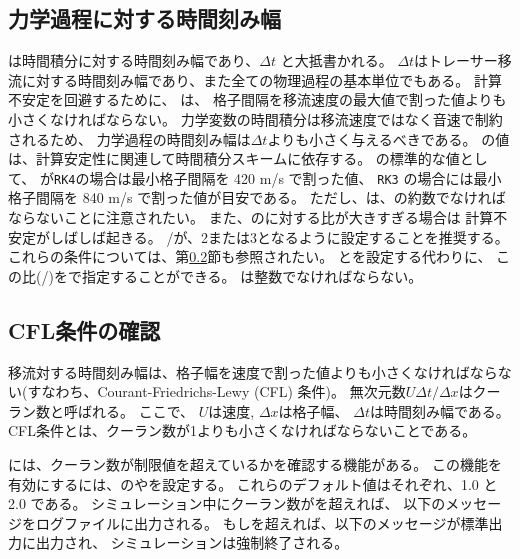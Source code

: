 \subsection{力学過程に対する時間刻み幅}

 は時間積分に対する時間刻み幅であり、$\Delta t$ と大抵書かれる。
$\Delta t$はトレーサー移流に対する時間刻み幅であり、また全ての物理過程の基本単位でもある。
計算不安定を回避するために、 は、
格子間隔を移流速度の最大値で割った値よりも小さくなければならない。
力学変数の時間積分は移流速度ではなく音速で制約されるため、
力学過程の時間刻み幅は$\Delta t$よりも小さく与えるべきである。
の値は、計算安定性に関連して時間積分スキームに依存する。
の標準的な値として、
が\verb|RK4|の場合は最小格子間隔を 420 m/s で割った値、
\verb|RK3| の場合には最小格子間隔を 840 m/s で割った値が目安である。
ただし、は、の約数でなければならないことに注意されたい。
また、のに対する比が大きすぎる場合は
計算不安定がしばしば起きる。
/が、2または3となるように設定することを推奨する。
これらの条件については、第\ref{subsec:cfl_check}節も参照されたい。
とを設定する代わりに、
この比(/)をで指定することができる。
は整数でなければならない。

\subsection{CFL条件の確認} \label{subsec:cfl_check}

移流対する時間刻み幅は、格子幅を速度で割った値よりも小さくなければならない(すなわち、Courant-Friedrichs-Lewy (CFL) 条件)。
無次元数$U \Delta t/\Delta x$はクーラン数と呼ばれる。
ここで、 $U$は速度, $\Delta x$は格子幅、 $\Delta t$は時間刻み幅である。
CFL条件とは、クーラン数が1よりも小さくなければならないことである。

\scalerm には、クーラン数が制限値を超えているかを確認する機能がある。
この機能を有効にするには、のやを設定する。
これらのデフォルト値はそれぞれ、1.0 と 2.0 である。
シミュレーション中にクーラン数がを超えれば、
以下のメッセージをログファイルに出力される。
もしを超えれば、以下のメッセージが標準出力に出力され、
シミュレーションは強制終了される。

